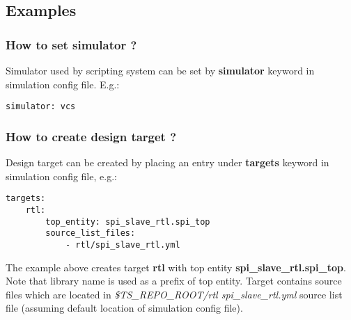 \documentclass{tropic_design_spec}
\begin{document}

\pagebreak
\subsection{Examples}


\subsubsection{How to set simulator ?}
\label{sec:how-to-set-simulator}

Simulator used by scripting system can be set by \textbf{simulator} keyword in
simulation config file. E.g.:

\begin{lstlisting}
simulator: vcs
\end{lstlisting}




\subsubsection{How to create design target ?}
\label{sec:how-to-create-design-target}

Design target can be created by placing an entry under \textbf{targets} keyword in
simulation config file, e.g.:

\begin{lstlisting}
targets:
    rtl:
        top_entity: spi_slave_rtl.spi_top
        source_list_files:
            - rtl/spi_slave_rtl.yml
\end{lstlisting}

The example above creates target \textbf{rtl} with top entity 
\textbf{spi_slave_rtl.spi_top}. Note that library name is used as a prefix of top entity. 
Target contains source files which are located in
\textit{\$TS_REPO_ROOT/rtl spi_slave_rtl.yml} source list file (assuming default location
of simulation config file).
\end{document}
